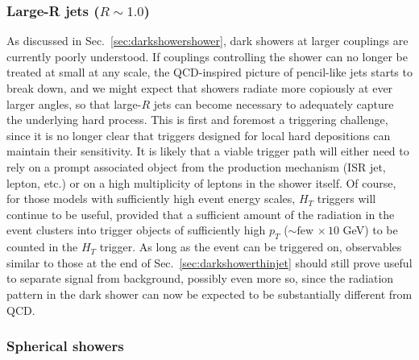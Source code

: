 \begin{enumerate}
\subsubsection{Large-R jets ($R \sim 1.0$)}
\label{sec:darkshowerfatjet}

As discussed in Sec.~\ref{sec:darkshowershower}, dark showers at larger couplings are currently poorly understood. If couplings controlling the shower can no longer be treated at small at any scale, the QCD-inspired picture of pencil-like jets starts to break down, and we might expect that showers radiate more copiously at ever larger angles, so that large-$R$ jets can become necessary to adequately capture the underlying hard process. This is first and foremost a triggering challenge, since it is no longer clear that triggers designed for local hard depositions can maintain their sensitivity. It is likely that a viable trigger path will either need to rely on a prompt associated object from the production mechanism (ISR jet, lepton, etc.) or on a high multiplicity of leptons in the shower itself. Of course, for those models with sufficiently high event energy scales, $H_T$ triggers will continue to be useful, provided that a sufficient amount of the radiation in the event clusters into trigger objects of sufficiently high $p_T$ ($\sim\mathrm{few \,}\times 10$ GeV) to be counted in the $H_T$ trigger. As long as the event can be triggered on, observables similar to those at the end of Sec.~\ref{sec:darkshowerthinjet} should still prove useful to separate signal from background, possibly even more so, since the radiation pattern in the dark shower can now be expected to be substantially different from QCD.


\subsubsection{Spherical showers} %


\end{enumerate}
